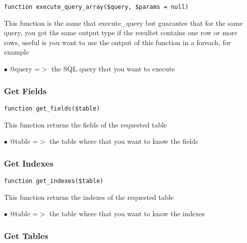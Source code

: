 \documentclass[a4paper]{article}
\begin{document}
\begin{lstlisting}
function execute_query_array($query, $params = null)
\end{lstlisting}

This function is the same that execute\_query but guarantee that for the
same query, you get the same output type if the resultet contains one
row or more rows, useful is you want to use the output of this function
in a foreach, for example

\begin{compactitem}
\item[\color{myblue}$\bullet$] @query =$>$ the SQL query that you want to execute
\end{compactitem}

\hypertarget{toc220}{}
\subsubsection{Get Fields}

\begin{lstlisting}
function get_fields($table)
\end{lstlisting}

This function returns the fields of the requested table

\begin{compactitem}
\item[\color{myblue}$\bullet$] @table =$>$ the table where that you want to know the fields
\end{compactitem}

\hypertarget{toc221}{}
\subsubsection{Get Indexes}

\begin{lstlisting}
function get_indexes($table)
\end{lstlisting}

This function returns the indexes of the requested table

\begin{compactitem}
\item[\color{myblue}$\bullet$] @table =$>$ the table where that you want to know the indexes
\end{compactitem}

\hypertarget{toc222}{}
\subsubsection{Get Tables}
\end{document}
